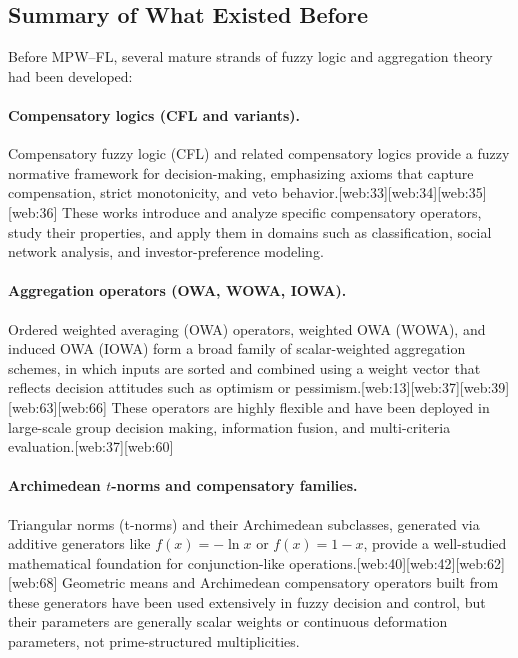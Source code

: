 \documentclass[11pt]{article}
\begin{document}
\subsection{Summary of What Existed Before}
\label{subsec:prior-summary}

Before MPW--FL, several mature strands of fuzzy logic and aggregation theory had been developed:

\paragraph{Compensatory logics (CFL and variants).}
Compensatory fuzzy logic (CFL) and related compensatory logics provide a fuzzy normative framework for decision-making, emphasizing axioms that capture compensation, strict monotonicity, and veto behavior.[web:33][web:34][web:35][web:36] These works introduce and analyze specific compensatory operators, study their properties, and apply them in domains such as classification, social network analysis, and investor-preference modeling.

\paragraph{Aggregation operators (OWA, WOWA, IOWA).}
Ordered weighted averaging (OWA) operators, weighted OWA (WOWA), and induced OWA (IOWA) form a broad family of scalar-weighted aggregation schemes, in which inputs are sorted and combined using a weight vector that reflects decision attitudes such as optimism or pessimism.[web:13][web:37][web:39][web:63][web:66] These operators are highly flexible and have been deployed in large-scale group decision making, information fusion, and multi-criteria evaluation.[web:37][web:60]

\paragraph{Archimedean $t$-norms and compensatory families.}
Triangular norms (t-norms) and their Archimedean subclasses, generated via additive generators like $f(x)=-\ln x$ or $f(x)=1-x$, provide a well-studied mathematical foundation for conjunction-like operations.[web:40][web:42][web:62][web:68] Geometric means and Archimedean compensatory operators built from these generators have been used extensively in fuzzy decision and control, but their parameters are generally scalar weights or continuous deformation parameters, not prime-structured multiplicities.
\end{document}
